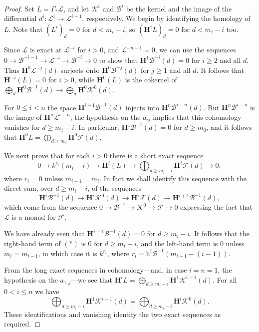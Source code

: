 \documentclass{tran-l}
\newcommand{\myB}{\mathcal{B}}
\newcommand{\F}{\mathcal{F}}
\newcommand{\K}{\mathcal{K}}
\newcommand{\myH}{\mathbf{H}}
\theoremstyle{plain}
\theoremstyle{remark}
\theoremstyle{definition}
\begin{document}
\begin{proof}  
Set $L=\Gamma _{*}\mathcal{L}$, 
and let $\K ^{i}$ and $\myB ^{i}$ be the  kernel and the image of the differential
$d^{i}:\mathcal{L}^{i}\to \mathcal{L}^{i+1}$, respectively. We begin by identifying the homology
of $L$. Note that $(L^{i})_{d}=0$ for $d<m_{i}-i$, so 
$(\myH ^{i}L)_{d} = 0$ for $d<m_{i}-i$ too.

Since $\mathcal{L}$ is exact at $\mathcal{L}^{-i}$ for
$i>0$, and $\mathcal{L}^{-n-1}=0$, we
can use the sequences 
$ 
0\to \myB ^{-i-1}\to \mathcal{L}^{-i}\to \myB ^{-i}\to 0
$
to show that $\myH ^{1}\myB ^{-i}(d)=0$ for $i\geq 2$ and
all $d$. Thus $\myH ^{0}\mathcal{L}^{-j}(d)$ surjects onto $\myH ^{0}\myB ^{-j}(d)$ for $j\geq 1$
and all $d$. It follows that $\myH ^{-i}(L)=0$ for $i>0$, while
$\myH ^{0}(L)$ is the cokernel of 
$\bigoplus _{d}\myH ^{0}\myB ^{-1}(d)\to \bigoplus _{d}\myH ^{0}\K ^{0}(d)$. 

For $0\leq i< n$ the space
$\myH ^{i+1}\myB ^{-1}(d)$ injects into $\myH ^{n}\myB ^{i-n}(d)$.
But $\myH ^{n}\myB ^{i-n}$ is the image of $\myH ^{n}\mathcal{L}^{i-n}$; the
hypothesis on the $a_{ij}$ implies that this cohomology vanishes for
$d\geq m_{i}-i$. In particular, 
$\myH ^{1}\myB ^{-1}(d)=0$ for $d\geq m_{0}$, and it follows that 
$\myH ^{0}L=\bigoplus _{d\geq m_{0}}\myH ^{0}\F (d)$.

We next prove that for each $i>0$ there is a short exact sequence
\begin{equation*}
0\to k^{r_{i}}(m_{i}-i)  
\to \myH ^{i}(L) \to \bigoplus _{d\geq m_{i}-i} \myH ^{i} \F (d)\to 0,
\tag*{($*$)}\end{equation*}
where $r_{i}=0$ unless $m_{i-1}=m_{i}$.
In fact we shall identify this sequence with the direct sum,
over $d\geq m_{i}-i$, of the sequences
\begin{equation*}\myH ^{i}\myB ^{-1}(d)\to \myH ^{i}\K ^{0}(d)\to \myH ^{i}\F
(d)\to \myH ^{i+1}\myB ^{-1}(d),
\end{equation*}
which come from the sequence
$0\to \myB ^{-1}\to \K ^{0} \to \F \to 0
$
expressing the fact that $\mathcal{L}$ is a monad for $\F $.

We have already seen that $\myH ^{i+1}\myB ^{-1}(d)=0$ for $d\geq m_{i}-i$.
It follows that the right-hand term of $(*)$ is 0 for
$d\geq m_{i}-i$, and the left-hand term is 0 unless $m_{i}=m_{i-1}$,
in which case it is $k^{r_{i}}$, where
$r_{i}={\mathrm{h}}^{i}\myB ^{-1}(m_{i-1}-(i-1))$.

From the long exact sequences in cohomology---and, in case $i=n=1$, the
hypothesis on the $a_{1,j}$---we see that 
$\myH ^{i} L=\bigoplus _{d\geq m_{i}-i}\myH ^{1}\K ^{i-1}(d)$.
For all $0<i\leq n$ we have 
\begin{equation*}\bigoplus _{d\geq m_{i}-i} \myH ^{1} \K ^{i-1}(d)=\bigoplus _{d\geq m_{i}-i} \myH ^{i} \K ^{0}(d).
\end{equation*}
These identifications and vanishing
identify the two exact sequences as required.


\end{proof}
\end{document}
